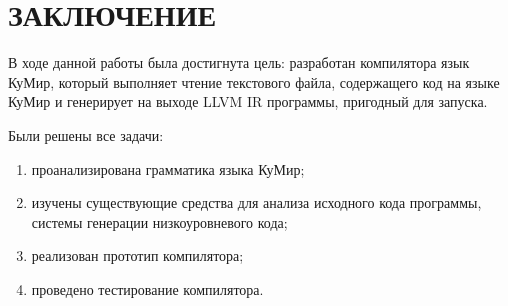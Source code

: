 \section*{ЗАКЛЮЧЕНИЕ}
{}

В ходе данной работы была достигнута цель: разработан компилятора язык КуМир, который выполняет чтение текстового файла, содержащего код на языке КуМир и генерирует на выходе LLVM IR программы, пригодный для запуска. 

Были решены все задачи:
\begin{enumerate}
	\item проанализирована грамматика языка КуМир;
	\item изучены существующие средства для анализа исходного кода программы, системы генерации низкоуровневого кода;
	\item реализован прототип компилятора;
	\item проведено тестирование компилятора.
\end{enumerate}

\newpage